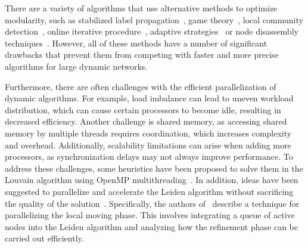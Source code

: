 There are a variety of algorithms that use alternative methods to optimize modularity, such as stabilized label propagation~\cite{XCS13}, game theory~\cite{JX15}, local community detection~\cite{ZB15}, online iterative procedure~\cite{RPP17}, adaptive strategies~\cite{ZCL19} or node disassembly techniques~\cite{RKN24}. However, all of these methods have a number of significant drawbacks that prevent them from competing with faster and more precise algorithms for large dynamic networks.

Furthermore, there are often challenges with the efficient parallelization of dynamic algorithms. For example, load imbalance can lead to uneven workload distribution, which can cause certain processors to become idle, resulting in decreased efficiency. Another challenge is shared memory, as accessing shared memory by multiple threads requires coordination, which increases complexity and overhead. Additionally, scalability limitations can arise when adding more processors, as synchronization delays may not always improve performance. To address these challenges, some heuristics have been proposed to solve them in the Louvain algorithm using OpenMP multithreading~\cite{LHK14}. In addition, ideas have been suggested to parallelize and accelerate the Leiden algorithm without sacrificing the quality of the solution~\cite{US21,VTT19}. Specifically, the authors of~\cite{US21} describe a technique for parallelizing the local moving phase. This involves integrating a queue of active nodes into the Leiden algorithm and analyzing how the refinement phase can be carried out efficiently.

